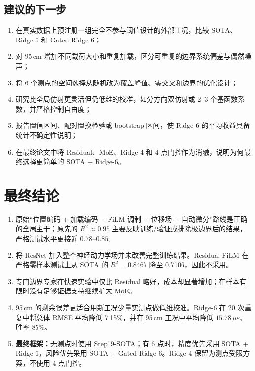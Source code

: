 \documentclass[11pt,a4paper]{article}
\newcommand{\ue}{\,\mu\varepsilon}
\begin{document}
\subsection{建议的下一步}

\begin{enumerate}
  \item 在真实数据上预注册一组完全不参与阈值设计的外部工况，比较 SOTA、Ridge-6 和 Gated Ridge-6；
  \item 对 95\,cm 增加不同载荷大小和重复加载，区分可重复的边界系统偏差与偶然噪声；
  \item 将 6 个测点的空间选择从随机改为覆盖峰值、零交叉和边界的优化设计；
  \item 研究比全局仿射更灵活但仍低维的校准，如分方向双仿射或 2--3 个基函数系数，并严格控制自由度；
  \item 报告置信区间、配对置换检验或 bootstrap 区间，使 Ridge-6 的平均收益具备统计不确定性说明；
  \item 在最终论文中将 Residual、MoE、Ridge-4 和 4 点门控作为消融，说明为何最终选择更简单的 SOTA + Ridge-6。
\end{enumerate}

\section{最终结论}

\begin{conclusionbox}
\begin{enumerate}
  \item 原始“位置编码 + 加载编码 + FiLM 调制 + 位移场 + 自动微分”路线是正确的全局主干；原先的 $R^2\approx0.95$ 主要反映训练/验证或排除极边界后的结果，严格测试水平更接近 $0.78$--$0.85$。
  \item 将 ResNet 加入整个神经动力学场并未改善完整训练结果。Residual-FiLM 在严格零样本测试上从 SOTA 的 $R^2=0.8467$ 降至 0.7106，因此不采用。
  \item 专门边界专家在快速实验中仅比 Residual 略好，成本却显著增加；在样本有限时没有足够证据支持继续扩大 MoE。
  \item 95\,cm 的剩余误差更适合用新工况少量实测点做低维校准。Ridge-6 在 20 次重复中将总体 RMSE 平均降低 7.15\%，并在 95\,cm 工况中平均降低 $15.78\ue$、胜率 85\%。
  \item \textbf{最终框架：}无测点时使用 Step19-SOTA；有 6 点时，精度优先采用 SOTA + Ridge-6，风险优先采用 SOTA + Gated Ridge-6。Ridge-4 保留为测点受限方案，不使用 4 点门控。
\end{enumerate}
\end{conclusionbox}
\end{document}
